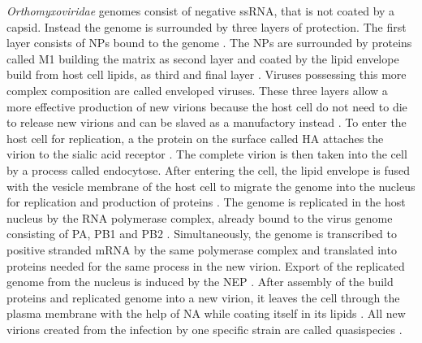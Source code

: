 \textit{Orthomyxoviridae} genomes consist of negative \gls{ssRNA}, that is not coated by a capsid. Instead the genome is surrounded by three layers of protection. The first layer consists of \glspl{NP} bound to the genome \autocite{influenza_all}. The \glspl{NP} are surrounded by proteins called \gls{M1} building the matrix as second layer and coated by the lipid envelope build from host cell lipids, as third and final layer \autocite{influenza_all}. Viruses possessing this more complex composition are called enveloped viruses. These three layers allow a more effective production of new virions because the host cell do not %
need to die to release new virions and can be slaved as a manufactory instead \autocite{buch}. To enter the host cell for replication, a the protein on the surface called \gls{HA} attaches the virion to the sialic acid receptor \autocite{influenza_all}. The complete virion is then taken into the cell by a process called endocytose. After entering the cell, the lipid envelope is fused with the vesicle membrane of the host cell to migrate the genome into the nucleus for replication and production of proteins \autocite{influenza_all}. The genome is replicated in the host nucleus by the RNA polymerase complex, already bound to the virus genome consisting of \gls{PA}, \gls{PB1} and \gls{PB2} \autocite{inf_natural}. Simultaneously, the genome is transcribed to positive stranded \gls{mRNA} by the same polymerase complex and translated into proteins needed for the same process in the new virion. Export of the replicated genome from the nucleus is induced by the \gls{NEP} \autocite{influenza_all}. After assembly of the build proteins and replicated genome into a new virion, it leaves the cell through the plasma membrane with the help of \gls{NA} while coating itself in its lipids \autocite{influenza_all}. All new virions created from the infection by one specific strain are called quasispecies \autocite{quasispecies}.

